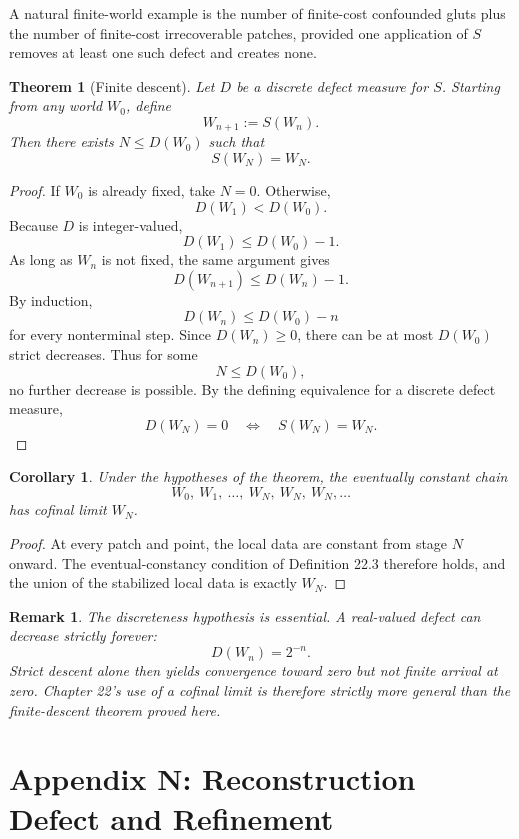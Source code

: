 \documentclass[11pt]{book}
\newtheorem*{appendixtheorem}{Theorem}
\newtheorem*{appendixcorollary}{Corollary}
\newtheorem*{appendixremark}{Remark}
\begin{document}
A natural finite-world example is the number of finite-cost confounded
gluts plus the number of finite-cost irrecoverable patches, provided one
application of $S$ removes at least one such defect and creates none.

\begin{appendixtheorem}[Finite descent]
Let $D$ be a discrete defect measure for $S$. Starting from any world
$W_0$, define
\[
W_{n+1}:=S(W_n).
\]
Then there exists $N\leq D(W_0)$ such that
\[
S(W_N)=W_N.
\]
\end{appendixtheorem}

\begin{proof}
If $W_0$ is already fixed, take $N=0$. Otherwise,
\[
D(W_1)<D(W_0).
\]
Because $D$ is integer-valued,
\[
D(W_1)\leq D(W_0)-1.
\]
As long as $W_n$ is not fixed, the same argument gives
\[
D(W_{n+1})\leq D(W_n)-1.
\]
By induction,
\[
D(W_n)\leq D(W_0)-n
\]
for every nonterminal step. Since $D(W_n)\geq0$, there can be at most
$D(W_0)$ strict decreases. Thus for some
\[
N\leq D(W_0),
\]
no further decrease is possible. By the defining equivalence for a
discrete defect measure,
\[
D(W_N)=0
\quad\Longleftrightarrow\quad
S(W_N)=W_N.
\]
\end{proof}

\begin{appendixcorollary}
Under the hypotheses of the theorem, the eventually constant chain
\[
W_0,\ W_1,\ \dots,\ W_N,\ W_N,\ W_N,\dots
\]
has cofinal limit $W_N$.
\end{appendixcorollary}

\begin{proof}
At every patch and point, the local data are constant from stage $N$
onward. The eventual-constancy condition of Definition 22.3 therefore
holds, and the union of the stabilized local data is exactly $W_N$.
\end{proof}

\begin{appendixremark}
The discreteness hypothesis is essential. A real-valued defect can
decrease strictly forever:
\[
D(W_n)=2^{-n}.
\]
Strict descent alone then yields convergence toward zero but not finite
arrival at zero. Chapter 22's use of a cofinal limit is therefore
strictly more general than the finite-descent theorem proved here.
\end{appendixremark}


\chapter*{Appendix N: Reconstruction Defect and Refinement}
\end{document}
